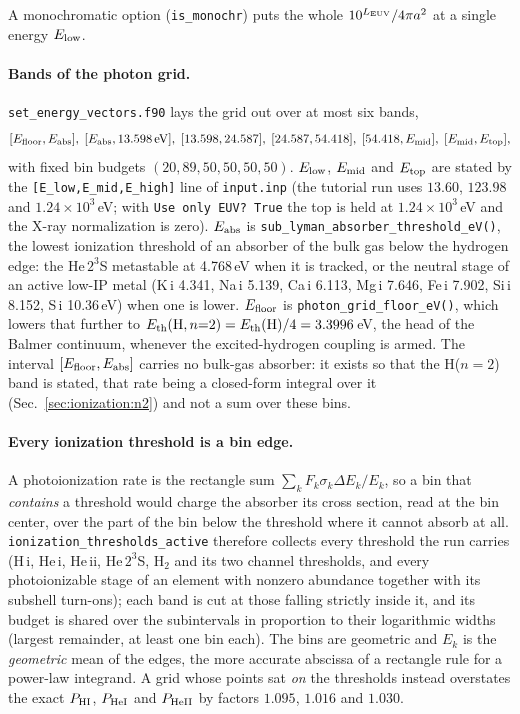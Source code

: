 A monochromatic option (\texttt{is\_monochr}) puts the whole
$10^{L_{\rm EUV}}/4\pi a^{2}$ at a single energy $E_{\rm low}$.

\paragraph{Bands of the photon grid.} \texttt{set\_energy\_vectors.f90}
lays the grid out over at most six bands,
\[
[E_{\rm floor},E_{\rm abs}],\;
[E_{\rm abs},13.598\,{\rm eV}],\;
[13.598,24.587],\;
[24.587,54.418],\;
[54.418,E_{\rm mid}],\;
[E_{\rm mid},E_{\rm top}],
\]
with fixed bin budgets $(20,89,50,50,50,50)$. $E_{\rm low}$, $E_{\rm mid}$
and $E_{\rm top}$ are stated by the
\texttt{[E\_low,E\_mid,E\_high]} line of \texttt{input.inp} (the tutorial
run uses $13.60$, $123.98$ and $1.24\times10^{3}$\,eV; with
\texttt{Use only EUV? True} the top is held at $1.24\times10^{3}$\,eV and
the X-ray normalization is zero). $E_{\rm abs}$ is
\texttt{sub\_lyman\_absorber\_threshold\_eV()}, the lowest ionization
threshold of an absorber of the bulk gas below the hydrogen edge: the
He\,$2^3$S metastable at 4.768\,eV when it is tracked, or the neutral stage
of an active low-IP metal (K\,{\sc i} 4.341, Na\,{\sc i} 5.139,
Ca\,{\sc i} 6.113, Mg\,{\sc i} 7.646, Fe\,{\sc i} 7.902, Si\,{\sc i} 8.152,
S\,{\sc i} 10.36\,eV) when one is lower. $E_{\rm floor}$ is
\texttt{photon\_grid\_floor\_eV()}, which lowers that further to
$E_{\rm th}({\rm H}, n{=}2) = E_{\rm th}({\rm H})/4 = 3.3996$\,eV, the head
of the Balmer continuum, whenever the excited-hydrogen coupling is armed.
The interval $[E_{\rm floor},E_{\rm abs}]$ carries no bulk-gas absorber: it
exists so that the H($n{=}2$) band is stated, that rate being a closed-form
integral over it (Sec.~\ref{sec:ionization:n2}) and not a sum over these bins.

\paragraph{Every ionization threshold is a bin edge.} A photoionization
rate is the rectangle sum $\sum_k F_k \sigma_k \Delta E_k/E_k$, so a bin
that \emph{contains} a threshold would charge the absorber its cross
section, read at the bin center, over the part of the bin below the threshold
where it cannot absorb at all. \texttt{ionization\_thresholds\_active}
therefore collects every threshold the run carries (H\,{\sc i},
He\,{\sc i}, He\,{\sc ii}, He\,$2^3$S, H$_2$ and its two channel
thresholds, and every photoionizable stage of an element with nonzero
abundance together with its subshell turn-ons); each band is cut at those
falling strictly inside it, and its budget is shared over the subintervals in
proportion to their logarithmic widths (largest remainder, at least one bin
each). The bins are geometric and $E_k$ is the \emph{geometric} mean of the
edges, the more accurate abscissa of a rectangle rule for a power-law
integrand. A grid whose points sat \emph{on} the thresholds instead overstates
the exact $P_{\rm HI}$, $P_{\rm HeI}$ and $P_{\rm HeII}$ by factors
$1.095$, $1.016$ and $1.030$.

